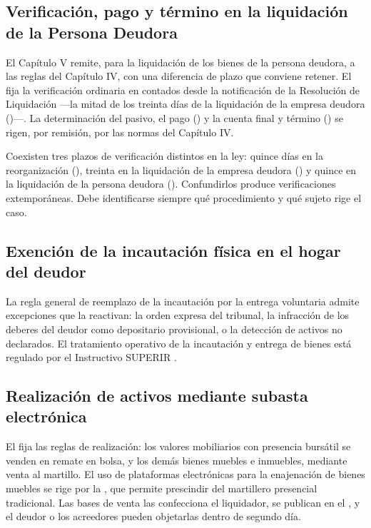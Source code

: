 \subsection{Verificación, pago y término en la liquidación de la Persona Deudora}

El Capítulo V remite, para la liquidación de los bienes de la persona deudora, a las reglas del
Capítulo IV, con una diferencia de plazo que conviene retener. El  fija la verificación
ordinaria en  contados desde la notificación de la Resolución de
Liquidación ---la mitad de los treinta días de la liquidación de la empresa deudora ()---.
La determinación del pasivo, el pago () y la cuenta final y término () se
rigen, por remisión, por las normas del Capítulo IV.

\begin{alerta}
Coexisten tres plazos de verificación distintos en la ley: quince días en la reorganización
(), treinta en la liquidación de la empresa deudora () y quince en la
liquidación de la persona deudora (). Confundirlos produce verificaciones
extemporáneas. Debe identificarse siempre qué procedimiento y qué sujeto rige el caso.
\end{alerta}

\subsection{Exención de la incautación física en el hogar del deudor}

La regla general de reemplazo de la incautación por la entrega voluntaria admite
excepciones que la reactivan: la orden expresa del tribunal, la infracción de los deberes
del deudor como depositario provisional, o la detección de activos no declarados. El
tratamiento operativo de la incautación y entrega de bienes está regulado por el
Instructivo SUPERIR  \parencite{instructivo-i5}.

\subsection{Realización de activos mediante subasta electrónica}

El  fija las reglas de realización: los valores mobiliarios con presencia bursátil
se venden en remate en bolsa, y los demás bienes muebles e inmuebles, mediante venta al
martillo. El uso de plataformas electrónicas para la enajenación de bienes muebles se rige
por la  \citeyearpar{ncg-25}, que permite prescindir del martillero presencial
tradicional. Las bases de venta las confecciona el liquidador, se publican en el
\boletin{}, y el deudor o los acreedores pueden objetarlas dentro de segundo día.

